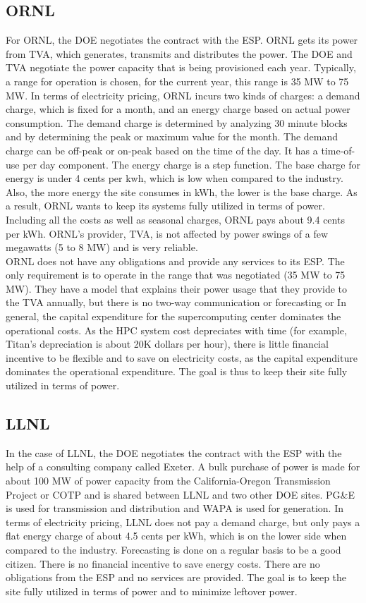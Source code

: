 \subsection{ORNL}
For ORNL, the DOE negotiates the contract with the ESP.  ORNL gets its power from TVA, which generates, transmits and distributes the power. The DOE and TVA negotiate the power capacity that is being provisioned each year. Typically, a range for operation is chosen, for the current year, this range is 35 MW to 75 MW. 
In terms of electricity pricing, ORNL incurs two kinds of charges: a demand charge, which is fixed for a month, and an energy charge based on actual power consumption. The demand charge is determined by analyzing 30 minute blocks and by determining the peak or maximum value for the month. The demand charge can be off-peak or on-peak based on the time of the day. It has a time-of-use per day component. The energy charge is a step function. The base charge for energy is under 4 cents per kwh, which is low when compared to the industry. Also, the more energy the site consumes in kWh, the lower is the base charge. As a result, ORNL wants to keep its systems fully utilized in terms of power. Including all the costs as well as seasonal charges, ORNL pays about 9.4 cents per kWh. ORNL's provider, TVA, is not affected by power swings of a few megawatts (5 to 8 MW) and is very reliable. \\

ORNL does not have any obligations and provide any services to its ESP.  The only requirement is to operate in the range that was negotiated (35 MW to 75 MW). They have a model that explains their power usage that they provide to the TVA annually, but there is no two-way communication or forecasting or In general, the capital expenditure for the supercomputing center dominates the operational costs. As the HPC system cost depreciates with time (for example, Titan's depreciation is about 20K dollars per hour), there is little financial incentive to be flexible and to save on electricity costs, as the capital expenditure dominates the operational expenditure. The goal is thus to keep their site fully utilized in terms of power. 

\subsection{LLNL}
In the case of LLNL, the DOE negotiates the contract with the ESP with the help of a consulting company called Exeter.  A bulk purchase of power is made for about 100 MW of power capacity from the California-Oregon Transmission Project or COTP and is shared between LLNL and two other DOE sites. PG\&E is used for transmission and distribution and WAPA is used for generation. In terms of electricity pricing, LLNL does not pay a demand charge, but only pays a flat energy charge of about 4.5 cents per kWh, which is on the lower side when compared to the industry. Forecasting is done on a regular basis to be a good citizen. There is no financial incentive to save energy costs. There are no obligations from the ESP and no services are provided. The goal is to keep the site fully utilized in terms of power and to minimize leftover power.  

